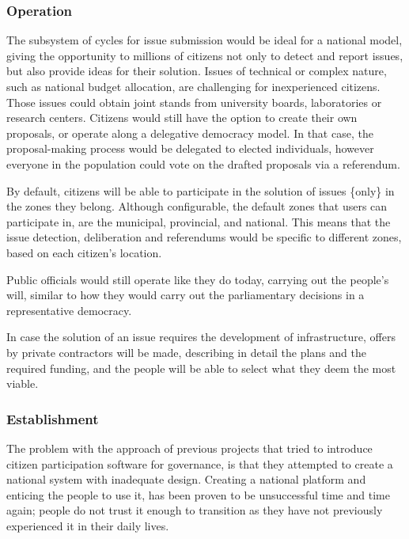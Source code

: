 \documentclass[a4paper,11pt]{article}
\begin{document}
\begin{multicols}{2}
\subsubsection{Operation} \label{operationnational}

The subsystem of cycles for issue submission would be ideal for a national model, giving the opportunity to millions of citizens not only to detect and report issues, but also provide ideas for their solution. Issues of technical or complex nature, such as national budget allocation, are challenging for inexperienced citizens. Those issues could obtain joint stands from university boards, laboratories or research centers. Citizens would still have the option to create their own proposals, or operate along a delegative democracy model. In that case, the proposal-making process would be delegated to elected individuals, however everyone in the population could vote on the drafted proposals via a referendum.

By default, citizens will be able to participate in the solution of issues \{only\} in the zones they belong. Although configurable, the default zones that users can participate in, are the municipal, provincial, and national. This means that the issue detection, deliberation and referendums would be specific to different zones, based on each citizen's location.

Public officials would still operate like they do today, carrying out the people's will, similar to how they would carry out the parliamentary decisions in a representative democracy.

In case the solution of an issue requires the development of infrastructure, offers by private contractors will be made, describing in detail the plans and the required funding, and the people will be able to select what they deem the most viable.

\subsubsection{Establishment} \label{establishmentnational}

The problem with the approach of previous projects that tried to introduce citizen participation software for governance, is that they attempted to create a national system with inadequate design. Creating a national platform and enticing the people to use it, has been proven to be unsuccessful time and time again; people do not trust it enough to transition as they have not previously experienced it in their daily lives.


\end{multicols}
\end{document}
